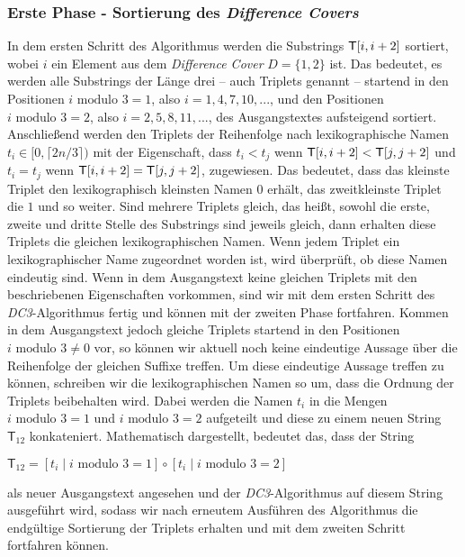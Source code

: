 \subsubsection{Erste Phase - Sortierung des \emph{Difference Covers}}
\label{dc3:algorithmus:phase1}

In dem ersten Schritt des Algorithmus werden die Substrings $\inputtext[i, i+2]$ sortiert, wobei $i$ ein Element aus dem \emph{Difference Cover} $D = \{1, 2\}$ ist. Das bedeutet, es werden alle Substrings der Länge drei -- auch Triplets genannt -- startend in den Positionen $i \text{ modulo } 3 = 1$, also $i = 1, 4, 7, 10,...$, und den Positionen $i \text{ modulo } 3 = 2$, also $i = 2, 5, 8, 11,...$, des Ausgangstextes  aufsteigend sortiert.
Anschließend werden den Triplets der Reihenfolge nach lexikographische Namen $t_i \in [0,\lceil2n/3\rceil)$ mit der Eigenschaft, dass $t_i < t_j$ wenn $\inputtext[i, i+2] < \inputtext[j, j+2]$ und $t_i = t_j$ wenn $\inputtext[i, i+2] = \inputtext[j, j+2]$, zugewiesen. Das bedeutet, dass das kleinste Triplet den lexikographisch kleinsten Namen $0$ erhält, das zweitkleinste Triplet die $1$ und so weiter. Sind mehrere Triplets gleich, das heißt, sowohl die erste, zweite und dritte Stelle des Substrings sind jeweils gleich, dann erhalten diese Triplets die gleichen lexikographischen Namen.
Wenn jedem Triplet ein lexikographischer Name zugeordnet worden ist, wird überprüft, ob diese Namen eindeutig sind. Wenn in dem Ausgangstext keine gleichen Triplets mit den beschriebenen Eigenschaften vorkommen, sind wir mit dem ersten Schritt des \emph{DC3}-Algorithmus fertig und können mit der zweiten Phase fortfahren. Kommen in dem Ausgangstext  jedoch gleiche Triplets startend in den Positionen $i \text{ modulo } 3 \neq 0$ vor, so können wir aktuell noch keine eindeutige Aussage über die Reihenfolge der gleichen Suffixe treffen. Um diese eindeutige Aussage treffen zu können, schreiben wir die lexikographischen Namen so um, dass die Ordnung der Triplets beibehalten wird. Dabei werden die Namen $t_i$ in die Mengen $i \text{ modulo } 3 = 1$ und $i \text{ modulo } 3 = 2$ aufgeteilt und diese zu einem neuen String $\mathsf{T}_{12}$ konkateniert. Mathematisch dargestellt, bedeutet das, dass der String
\begin{center}
	$\mathsf{T}_{12} = [t_i \mid i \text{ modulo } 3 = 1] \circ [t_i \mid i \text{ modulo } 3 = 2]$ 
\end{center}
als neuer Ausgangstext angesehen und der \emph{DC3}-Algorithmus auf diesem String ausgeführt wird, sodass wir nach erneutem Ausführen des Algorithmus die endgültige Sortierung der Triplets erhalten und mit dem zweiten Schritt fortfahren können.

